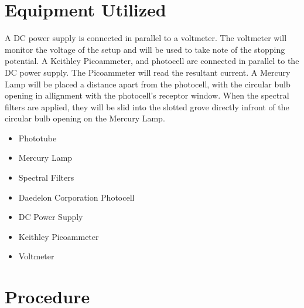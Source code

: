 \documentclass[a4paper]{article}
\begin{document}
\section{Equipment Utilized}

\qq A DC power supply is connected in parallel to a voltmeter. The
voltmeter will monitor the voltage of the setup and will be used to
take note of the stopping potential. A Keithley Picoammeter, and
photocell are connected in parallel to the DC power supply. The
Picoammeter will read the resultant current. A Mercury Lamp will be
placed a distance apart from the photocell, with the circular bulb
opening in allignment with the photocell's receptor window. When the
spectral filters are applied, they will be slid into the slotted grove
directly infront of the circular bulb opening on the Mercury Lamp.

\begin{itemize}
\item Phototube \\
\item Mercury Lamp \\
\item Spectral Filters \\
\item Daedelon Corporation Photocell \\
\item DC Power Supply \\
\item Keithley Picoammeter \\
\item Voltmeter \\
\end{itemize}

\begin{figure}[H]
\centering
\label{Photoelectric Effect Circuit Diagram}
\end{figure}

\section{Procedure}
\end{document}
